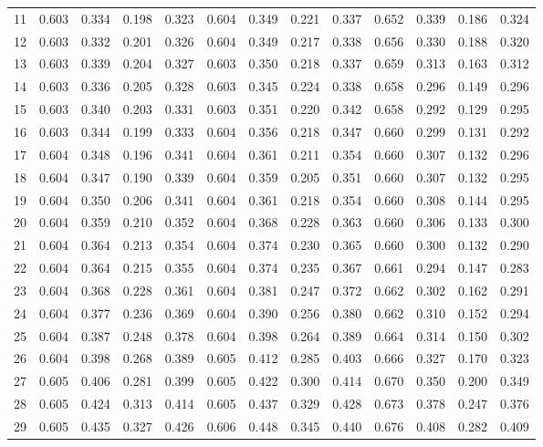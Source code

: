 \documentclass[11pt,a4paper]{article}
\begin{document}
\begin{landscape}
\begin{table}[p]
\begin{tabular}{rcccccccccccc}
11 & 0.603 & 0.334 & 0.198 & 0.323 & 0.604 & 0.349 & 0.221 & 0.337 & 0.652 & 0.339 & 0.186 & 0.324 \\
12 & 0.603 & 0.332 & 0.201 & 0.326 & 0.604 & 0.349 & 0.217 & 0.338 & 0.656 & 0.330 & 0.188 & 0.320 \\
13 & 0.603 & 0.339 & 0.204 & 0.327 & 0.603 & 0.350 & 0.218 & 0.337 & 0.659 & 0.313 & 0.163 & 0.312 \\
14 & 0.603 & 0.336 & 0.205 & 0.328 & 0.603 & 0.345 & 0.224 & 0.338 & 0.658 & 0.296 & 0.149 & 0.296 \\
15 & 0.603 & 0.340 & 0.203 & 0.331 & 0.603 & 0.351 & 0.220 & 0.342 & 0.658 & 0.292 & 0.129 & 0.295 \\
\midrule
16 & 0.603 & 0.344 & 0.199 & 0.333 & 0.604 & 0.356 & 0.218 & 0.347 & 0.660 & 0.299 & 0.131 & 0.292 \\
17 & 0.604 & 0.348 & 0.196 & 0.341 & 0.604 & 0.361 & 0.211 & 0.354 & 0.660 & 0.307 & 0.132 & 0.296 \\
18 & 0.604 & 0.347 & 0.190 & 0.339 & 0.604 & 0.359 & 0.205 & 0.351 & 0.660 & 0.307 & 0.132 & 0.295 \\
19 & 0.604 & 0.350 & 0.206 & 0.341 & 0.604 & 0.361 & 0.218 & 0.354 & 0.660 & 0.308 & 0.144 & 0.295 \\
20 & 0.604 & 0.359 & 0.210 & 0.352 & 0.604 & 0.368 & 0.228 & 0.363 & 0.660 & 0.306 & 0.133 & 0.300 \\
21 & 0.604 & 0.364 & 0.213 & 0.354 & 0.604 & 0.374 & 0.230 & 0.365 & 0.660 & 0.300 & 0.132 & 0.290 \\
22 & 0.604 & 0.364 & 0.215 & 0.355 & 0.604 & 0.374 & 0.235 & 0.367 & 0.661 & 0.294 & 0.147 & 0.283 \\
23 & 0.604 & 0.368 & 0.228 & 0.361 & 0.604 & 0.381 & 0.247 & 0.372 & 0.662 & 0.302 & 0.162 & 0.291 \\
\midrule
24 & 0.604 & 0.377 & 0.236 & 0.369 & 0.604 & 0.390 & 0.256 & 0.380 & 0.662 & 0.310 & 0.152 & 0.294 \\
25 & 0.604 & 0.387 & 0.248 & 0.378 & 0.604 & 0.398 & 0.264 & 0.389 & 0.664 & 0.314 & 0.150 & 0.302 \\
26 & 0.604 & 0.398 & 0.268 & 0.389 & 0.605 & 0.412 & 0.285 & 0.403 & 0.666 & 0.327 & 0.170 & 0.323 \\
27 & 0.605 & 0.406 & 0.281 & 0.399 & 0.605 & 0.422 & 0.300 & 0.414 & 0.670 & 0.350 & 0.200 & 0.349 \\
28 & 0.605 & 0.424 & 0.313 & 0.414 & 0.605 & 0.437 & 0.329 & 0.428 & 0.673 & 0.378 & 0.247 & 0.376 \\
29 & 0.605 & 0.435 & 0.327 & 0.426 & 0.606 & 0.448 & 0.345 & 0.440 & 0.676 & 0.408 & 0.282 & 0.409 \\

\end{tabular}
\end{table}
\end{landscape}
\end{document}
